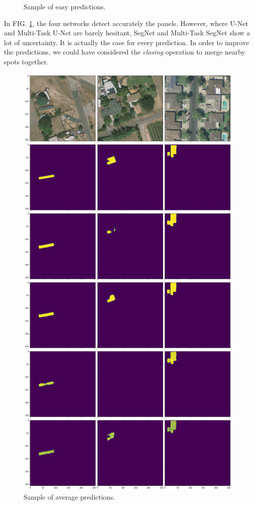 \documentclass[twocolumn,superscriptaddress,aps,nofootinbib]{revtex4-1}
\begin{document}
\begin{figure}[h]
    \caption{Sample of easy predictions.}
    \label{fig:easy_sample}
\end{figure}

In FIG. \ref{fig:easy_sample}, the four networks detect accurately the panels. However, where U-Net and Multi-Task U-Net are barely hesitant, SegNet and Multi-Task SegNet show a lot of uncertainty. It is actually the case for every prediction. In order to improve the predictions, we could have considered the \emph{closing} operation to merge nearby spots together.

\begin{figure}[h]
    \centering
    \includegraphics[width=\columnwidth]{resources/png/good.png}
    \caption{Sample of average predictions.}
    \label{fig:average_sample_1}
\end{figure}
\end{document}
